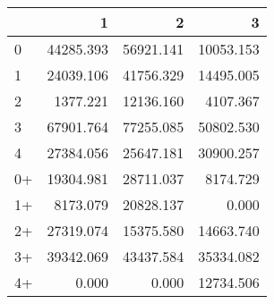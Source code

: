 \begin{tabular}{lrrr}
\toprule
     &         1 &         2 &         3 \\
\midrule
 0   & \num{44285.393} & \num{56921.141} & \num{10053.153} \\
 1   & \num{24039.106} & \num{41756.329} & \num{14495.005} \\
 2   &  \num{1377.221} & \num{12136.160} &  \num{4107.367} \\
 3   & \num{67901.764} & \num{77255.085} & \num{50802.530} \\
 4   & \num{27384.056} & \num{25647.181} & \num{30900.257} \\
 0+  & \num{19304.981} & \num{28711.037} &  \num{8174.729} \\
 1+  &  \num{8173.079} & \num{20828.137} &     \num{0.000} \\
 2+  & \num{27319.074} & \num{15375.580} & \num{14663.740} \\
 3+  & \num{39342.069} & \num{43437.584} & \num{35334.082} \\
 4+  &     \num{0.000} &     \num{0.000} & \num{12734.506} \\
\bottomrule
\end{tabular}